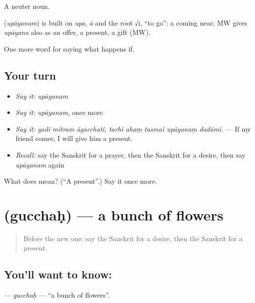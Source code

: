 A neuter noun.

\begin{cousinweb}
\textbf{} (\emph{upāyanam}) is built on \emph{upa}, \emph{ā} and the root √i, \textquotedblleft{}to go\textquotedblright{}: a coming near; MW gives \emph{upāyana} also as an offer, a present, a gift (MW).
\end{cousinweb}

\begin{grammarlens}[title={What you've built}]
One more word for saying what happens if.
\end{grammarlens}

\subsection*{Your turn}
\begin{itemize}
\raggedright
  \item \emph{Say it:} \emph{upāyanam}
  \item \emph{Say it:} \emph{upāyanam}, once more
  \item \emph{Say it:} \emph{yadi mitram āgacchati, tarhi ahaṃ tasmai upāyanaṃ dadāmi.} — If my friend comes, I will give him a present.
  \item \emph{Recall:} say the Sanskrit for a prayer, then the Sanskrit for a desire, then say \emph{upāyanam} again
\end{itemize}

\begin{tcolorbox}[breakable,colback=teal!4,colframe=teal!35!black,title={Before you move on}]
What does  mean? (\textquotedblleft{}A present\textquotedblright{}.) Say it once more.
\end{tcolorbox}
\section[\texorpdfstring{\sk{गुच्छः} (gucchaḥ)}{गुच्छः (gucchaḥ)}]{ (gucchaḥ) — a bunch of flowers}

\label{lesson:SA-C532-gucchah}



\begin{quote}
Before the new one: say the Sanskrit for a desire, then the Sanskrit for a present.
\end{quote}

\subsection*{You'll want to know: }
\textbf{} — \emph{gucchaḥ} — \textquotedblleft{}a bunch of flowers\textquotedblright{}.

